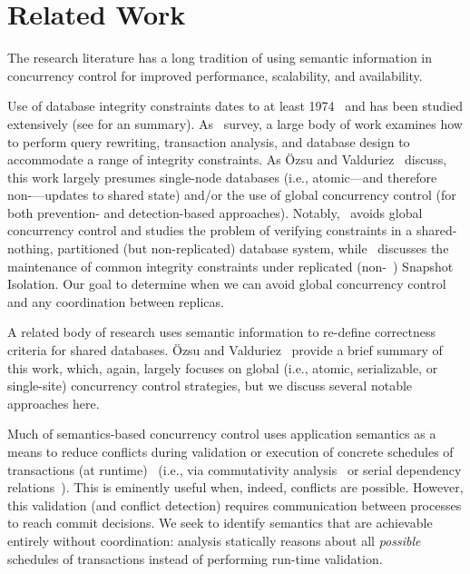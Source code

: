 
\section{Related Work}
\label{sec:relatedwork}

The research literature has a long tradition of using semantic
information in concurrency control for improved performance,
scalability, and availability.


 Use of database integrity constraints
dates to at least 1974~\cite{florentin-constraints} and has been
studied extensively (see \cite{tamer-book} for an
summary). As~\cite{ic-survey,ic-survey-two} survey, a large body of
work examines how to perform query rewriting, transaction analysis,
and database design to accommodate a range of integrity
constraints. As \"{O}zsu and Valduriez~\cite{tamer-book} discuss, this
work largely presumes single-node databases (i.e., atomic---and
therefore non-\cfree---updates to shared state) and/or the use of
global concurrency control (for both prevention- and detection-based
approaches). Notably,~\cite{local-verification} avoids global
concurrency control and studies the problem of verifying constraints
in a shared-nothing, partitioned (but non-replicated) database system,
while~\cite{kemme-si-ic} discusses the maintenance of common integrity
constraints under replicated (non-\cfree~\cite{hat-vldb}) Snapshot
Isolation. Our goal to determine when we can avoid global concurrency
control and any coordination between replicas.


 A related body of
research uses semantic information to re-define correctness criteria
for shared databases. \"{O}zsu and Valduriez~\cite{tamer-book} provide
a brief summary of this work, which, again, largely focuses on global
(i.e., atomic, serializable, or single-site) concurrency control
strategies, but we discuss several notable approaches here.

Much of semantics-based concurrency control uses application semantics
as a means to reduce conflicts during validation or execution of
concrete schedules of transactions (at
runtime)~\cite{badrinath-semantics} (i.e., via commutativity
analysis~\cite{weihl-thesis} or serial dependency
relations~\cite{herlihy-apologizing}). This is eminently useful when,
indeed, conflicts are possible. However, this validation (and conflict
detection) requires communication between processes to reach commit
decisions. We seek to identify semantics that are achievable entirely
without coordination: \iconfluence analysis statically reasons about
all \textit{possible} schedules of transactions instead of performing
run-time validation.

